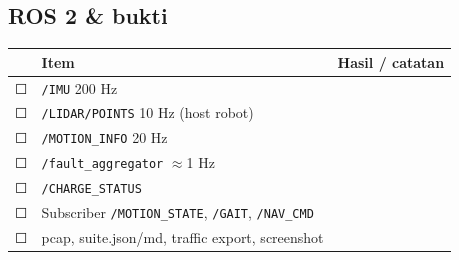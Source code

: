 \documentclass[11pt,a4paper]{article}
\newcommand{\code}[1]{\texttt{#1}}
\newcommand{\cb}{{\symfont\large ☐}}
\begin{document}
\subsection*{ROS 2 \& bukti}

\begin{tabularx}{\linewidth}{@{}l L{60mm}Y@{}}
\toprule
 & \textbf{Item} & \textbf{Hasil / catatan}\\\midrule
\cb & \code{/IMU} 200 Hz & \\
\cb & \code{/LIDAR/POINTS} 10 Hz (host robot) & \\
\cb & \code{/MOTION\_INFO} 20 Hz & \\
\cb & \code{/fault\_aggregator} $\approx$1 Hz & \\
\cb & \code{/CHARGE\_STATUS} & \\
\cb & Subscriber \code{/MOTION\_STATE}, \code{/GAIT}, \code{/NAV\_CMD} & \\
\cb & pcap, suite.json/md, traffic export, screenshot & \\
\bottomrule
\end{tabularx}

\end{document}
